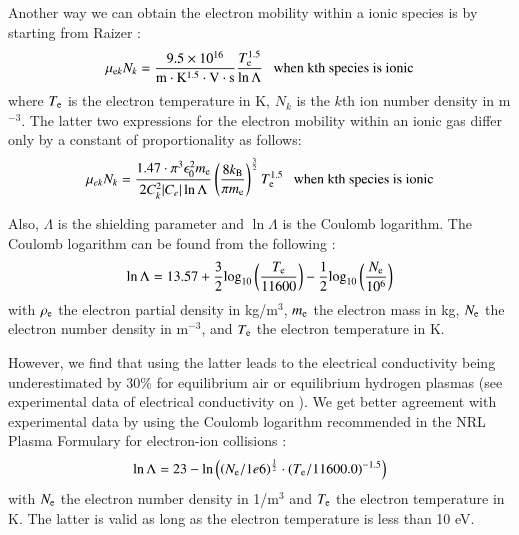 \documentclass{warpdoc}
\begin{document}
%
Another way we can obtain the electron mobility within a ionic species is by starting from Raizer \cite[Eq.\ (2.9)]{book:1991:raizer}:
%
\begin{equation}
\mu_{{\rm e}k} N_k= \frac{9.5 \times 10^{16}}{\rm m\cdot K^{1.5}\cdot V \cdot s} \frac{T_{\rm e}^{1.5}}{ \ln \Lambda} {\rm ~~~when~kth~species~is~ionic}
\end{equation}
%
where $T_{\rm e}$ is the electron temperature in K, $N_{k}$ is the $k$th ion number density in m$^{-3}$.
The latter two expressions for the electron mobility within an ionic gas differ only by a constant of proportionality as follows:
%
\begin{equation}
\mu_{ek}N_k = \frac{1.47 \cdot \pi^3 \epsilon_0^2 m_{\rm e}}{ 2  C_k^2 |C_e| \ln \Lambda } 
\left(\frac{8 k_{\rm B} }{\pi m_{\rm e}}\right)^\frac{3}{2} T_{\rm e}^{1.5} {\rm ~~~when~kth~species~is~ionic}
\end{equation}
%


Also, $\Lambda$ is the shielding parameter and $\ln \Lambda$ is the Coulomb logarithm. The Coulomb logarithm can be  found from the following \cite[p. 14]{book:1991:raizer}:
%
\begin{equation}
    \ln \Lambda=13.57+\frac{3}{2} {\rm log}_{10} \left(\frac{T_{\rm e}}{11600}\right)-\frac{1}{2}{\rm log}_{10}\left(\frac{N_{\rm e}}{10^6}\right)
\end{equation}
%
with $\rho_{\rm e}$ the electron partial density in kg/m$^3$, $m_{\rm e}$ the electron mass in kg, $N_{\rm e}$ the electron number density in m$^{-3}$, and $T_{\rm e}$ the electron temperature in K.

However, we find that using the latter leads to the electrical conductivity being underestimated by 30\% for equilibrium air or equilibrium hydrogen plasmas (see experimental data of electrical conductivity on \cite[page 276]{book:1991:raizer}). We get better agreement with experimental data by using the Coulomb logarithm recommended in the NRL Plasma Formulary for electron-ion collisions \cite[page 34]{nrl:2002:huba}:
%
\begin{equation}
 \ln \Lambda = 23-\ln \left(\left(N_{\rm e}/1e6\right)^\frac{1}{2} \cdot (T_{\rm e}/11600.0)^{-1.5}\right)
\end{equation}
%
with $N_{\rm e}$ the electron number density in 1/m$^3$ and $T_{\rm e}$ the electron temperature in K. The latter is valid as long as the electron temperature is less than 10 eV. 
\end{document}
